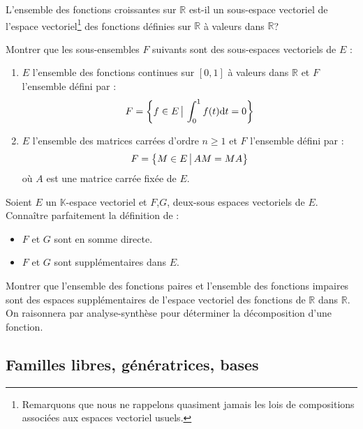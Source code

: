 \documentclass[a4paper,twoside,french,11pt]{VcCours}
\newcommand{\dt}{\text{d}t}
\begin{document}
\begin{Exercice}{}
  L'ensemble des fonctions croissantes sur $\mathbb{R}$ est-il un sous-espace vectoriel de l'espace vectoriel\footnote{Remarquons que nous ne rappelons quasiment jamais les lois de compositions associées aux espaces vectoriel usuels.} des fonctions définies sur $\mathbb{R}$ à valeurs dans $\mathbb{R}$?
\end{Exercice} 

\begin{Exercice}{}
  Montrer que les sous-ensembles $F$ suivants sont des sous-espaces vectoriels de $E$ :
  
  \begin{enumerate}
    \item $E$ l'ensemble des fonctions continues sur $[0,1]$ à valeurs dans $\mathbb{R}$ et $F$ l'ensemble défini par :
    $$ F = \left\lbrace f \in E \, \big{\vert} \, \int_{0}^1 f(t) \dt =0 \right\rbrace$$
    \item $E$ l'ensemble des matrices carrées d'ordre $n \geq 1$ et $F$ l'ensemble défini par :
    $$  F = \left\lbrace M \in E \, \big{\vert} \, AM=MA \right\rbrace$$
    où $A$ est une matrice carrée fixée de $E$.
  \end{enumerate}
\end{Exercice} 
  
\begin{ptc}{}
	Soient $E$ un $\mathbb{K}$-espace vectoriel et $F$,$G$, deux-sous espaces vectoriels de $E$. Connaître parfaitement la définition de :
\begin{itemize}
\item $F$ et $G$ sont en somme directe.
\item $F$ et $G$ sont supplémentaires dans $E$.
\end{itemize}
\end{ptc}

\begin{Exercice}{}
  Montrer que l'ensemble des fonctions paires et l'ensemble des fonctions impaires sont des espaces supplémentaires de l'espace vectoriel des fonctions de $\mathbb{R}$ dans $\mathbb{R}$. On raisonnera par analyse-synthèse pour déterminer la décomposition d'une fonction.
\end{Exercice} 

\subsection{Familles libres, génératrices, bases}
\end{document}
